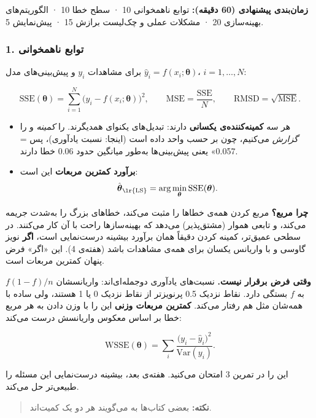\textbf{زمان‌بندی پیشنهادی (60 دقیقه):} توابع ناهمخوانی 10 · سطح خطا 10 ·
الگوریتم‌های بهینه‌سازی 20 · مشکلات عملی و چک‌لیست برازش 15 · پیش‌نمایش 5.

\subsubsection{1. توابع ناهمخوانی}

برای مشاهدات \(y_i\) و پیش‌بینی‌های مدل
\(\hat y_i = f(x_i; \boldsymbol\theta)\)، \(i = 1, \dots, N\):

\[
\mathrm{SSE}(\boldsymbol\theta) = \sum_{i=1}^{N} \big(y_i - f(x_i;\boldsymbol\theta)\big)^2, \qquad
\mathrm{MSE} = \frac{\mathrm{SSE}}{N}, \qquad
\mathrm{RMSD} = \sqrt{\mathrm{MSE}}.
\]

\begin{itemize}
\tightlist
\item
  هر سه \textbf{کمینه‌کننده‌ی یکسانی} دارند: تبدیل‌های یکنوای همدیگرند.
   را \emph{کمینه} و  را \emph{گزارش} می‌کنیم، چون
   بر حسب واحد داده است (اینجا: نسبت یادآوری)، پس  =
  0.057» یعنی پیش‌بینی‌ها به‌طور میانگین حدود 0.06 خطا دارند.
\item
  \textbf{برآورد کمترین مربعات} این است: \[
  \hat{\boldsymbol\theta}_{\text{\lr{LS}}} = \arg\min_{\boldsymbol\theta} \mathrm{SSE}(\boldsymbol\theta).
  \]
\end{itemize}

\textbf{چرا مربع؟} مربع کردن همه‌ی خطاها را مثبت می‌کند، خطاهای بزرگ را
به‌شدت جریمه می‌کند، و تابعی هموار (مشتق‌پذیر) می‌دهد که بهینه‌سازها راحت با
آن کار می‌کنند. در سطحی عمیق‌تر، کمینه کردن  دقیقاً همان برآورد
بیشینه درست‌نمایی است، \textbf{اگر} نویز گاوسی و با واریانس یکسان برای
همه‌ی مشاهدات باشد (هفته‌ی 4). این «اگر» فرض پنهان کمترین مربعات است.

\textbf{وقتی فرض برقرار نیست.} نسبت‌های یادآوری دوجمله‌ای‌اند: واریانسشان
\(f(1-f)/n\) به \(f\) بستگی دارد. نقاط نزدیک 0.5 پرنویزتر از نقاط نزدیک
0 یا 1 هستند، ولی  ساده با همه‌شان مثل هم رفتار می‌کند.
\textbf{کمترین مربعات وزنی}  این را با وزن
دادن به هر مربع خطا بر اساس معکوس واریانسش درست می‌کند:

\[
\mathrm{WSSE}(\boldsymbol\theta) = \sum_{i} \frac{\big(y_i - \hat y_i\big)^2}{\mathrm{Var}(y_i)}.
\]

این را در تمرین 3 امتحان می‌کنید. هفته‌ی بعد، بیشینه درست‌نمایی این مسئله
را طبیعی‌تر حل می‌کند.

\begin{quote}
\textbf{نکته:} بعضی کتاب‌ها به  می‌گویند  هر دو یک
کمیت‌اند.
\end{quote}

